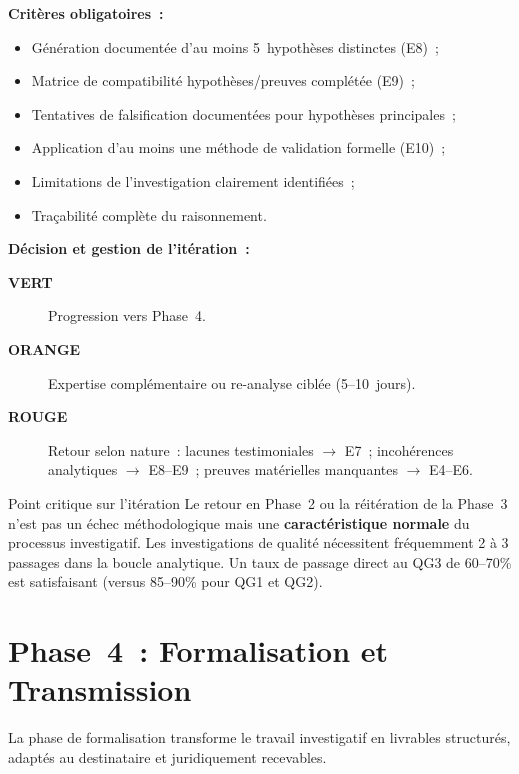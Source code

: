 \textbf{Critères obligatoires~:}
\begin{itemize}
    \item Génération documentée d'au moins 5~hypothèses distinctes (E8)~;
    \item Matrice de compatibilité hypothèses/preuves complétée (E9)~;
    \item Tentatives de falsification documentées pour hypothèses principales~;
    \item Application d'au moins une méthode de validation formelle (E10)~;
    \item Limitations de l'investigation clairement identifiées~;
    \item Traçabilité complète du raisonnement.
\end{itemize}

\textbf{Décision et gestion de l'itération~:}
\begin{description}
    \item[\textcolor{CouleurBordLizbiz}{\textbf{VERT}}] Progression vers Phase~4.
    \item[\textcolor{CouleurAccent}{\textbf{ORANGE}}] Expertise complémentaire
          ou re-analyse ciblée (5--10~jours).
    \item[\textcolor{CouleurBordAlerte}{\textbf{ROUGE}}] Retour selon nature~:
          lacunes testimoniales $\to$ E7~;
          incohérences analytiques $\to$ E8--E9~;
          preuves matérielles manquantes $\to$ E4--E6.
\end{description}

\begin{boiteRemarque}{Point critique sur l'itération}
Le retour en Phase~2 ou la réitération de la Phase~3 n'est pas un échec
méthodologique mais une \textbf{caractéristique normale} du processus
investigatif. Les investigations de qualité nécessitent fréquemment 2 à 3
passages dans la boucle analytique. Un taux de passage direct au QG3 de
60--70\% est satisfaisant (versus 85--90\% pour QG1 et QG2).
\end{boiteRemarque}

\section{Phase~4~: Formalisation et Transmission}
\label{sec:piu-phase4}

La phase de formalisation transforme le travail investigatif en livrables
structurés, adaptés au destinataire et juridiquement recevables.

